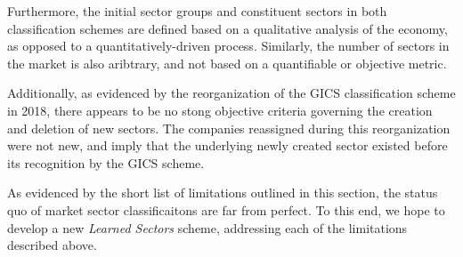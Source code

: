 \documentclass[../main.tex]{subfiles}
\begin{document}
Furthermore, the initial sector groups and constituent sectors in both classification schemes are defined based on a qualitative analysis of the economy, as opposed to a quantitatively-driven process. Similarly, the number of sectors in the market is also aribtrary, and not based on a quantifiable or objective metric.

Additionally, as evidenced by the reorganization of the GICS classification scheme in 2018, there appears to be no stong objective criteria governing the creation and deletion of new sectors. The companies reassigned during this reorganization were not new, and imply that the underlying newly created sector existed before its recognition by the GICS scheme.

As evidenced by the short list of limitations outlined in this section, the status quo of market sector classificaitons are far from perfect. To this end, we hope to develop a new \textit{Learned Sectors} scheme, addressing each of the limitations described above.
\end{document}
